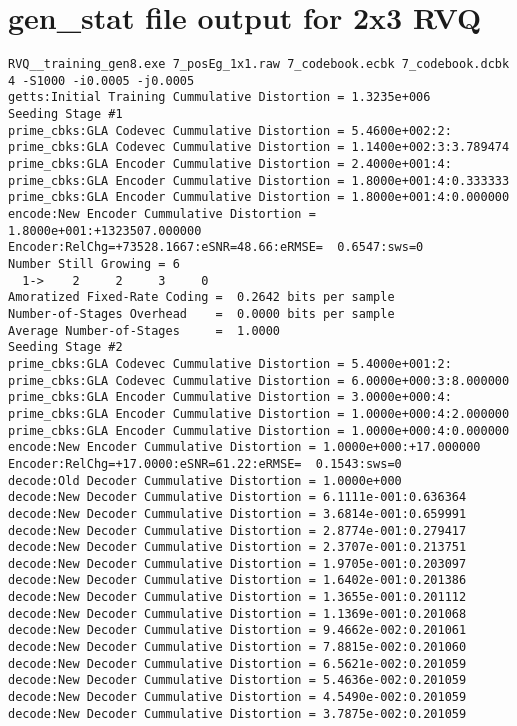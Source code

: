 \section{gen\_stat file output for 2x3 RVQ}
\label{gen_stat}
\scriptsize
\begin{verbatim}
RVQ__training_gen8.exe 7_posEg_1x1.raw 7_codebook.ecbk 7_codebook.dcbk 4 -S1000 -i0.0005 -j0.0005 
getts:Initial Training Cummulative Distortion = 1.3235e+006
Seeding Stage #1
prime_cbks:GLA Codevec Cummulative Distortion = 5.4600e+002:2:
prime_cbks:GLA Codevec Cummulative Distortion = 1.1400e+002:3:3.789474
prime_cbks:GLA Encoder Cummulative Distortion = 2.4000e+001:4:
prime_cbks:GLA Encoder Cummulative Distortion = 1.8000e+001:4:0.333333
prime_cbks:GLA Encoder Cummulative Distortion = 1.8000e+001:4:0.000000
encode:New Encoder Cummulative Distortion = 1.8000e+001:+1323507.000000
Encoder:RelChg=+73528.1667:eSNR=48.66:eRMSE=  0.6547:sws=0
Number Still Growing = 6
  1->    2     2     3     0 
Amoratized Fixed-Rate Coding =  0.2642 bits per sample
Number-of-Stages Overhead    =  0.0000 bits per sample
Average Number-of-Stages     =  1.0000
Seeding Stage #2
prime_cbks:GLA Codevec Cummulative Distortion = 5.4000e+001:2:
prime_cbks:GLA Codevec Cummulative Distortion = 6.0000e+000:3:8.000000
prime_cbks:GLA Encoder Cummulative Distortion = 3.0000e+000:4:
prime_cbks:GLA Encoder Cummulative Distortion = 1.0000e+000:4:2.000000
prime_cbks:GLA Encoder Cummulative Distortion = 1.0000e+000:4:0.000000
encode:New Encoder Cummulative Distortion = 1.0000e+000:+17.000000
Encoder:RelChg=+17.0000:eSNR=61.22:eRMSE=  0.1543:sws=0
decode:Old Decoder Cummulative Distortion = 1.0000e+000
decode:New Decoder Cummulative Distortion = 6.1111e-001:0.636364
decode:New Decoder Cummulative Distortion = 3.6814e-001:0.659991
decode:New Decoder Cummulative Distortion = 2.8774e-001:0.279417
decode:New Decoder Cummulative Distortion = 2.3707e-001:0.213751
decode:New Decoder Cummulative Distortion = 1.9705e-001:0.203097
decode:New Decoder Cummulative Distortion = 1.6402e-001:0.201386
decode:New Decoder Cummulative Distortion = 1.3655e-001:0.201112
decode:New Decoder Cummulative Distortion = 1.1369e-001:0.201068
decode:New Decoder Cummulative Distortion = 9.4662e-002:0.201061
decode:New Decoder Cummulative Distortion = 7.8815e-002:0.201060
decode:New Decoder Cummulative Distortion = 6.5621e-002:0.201059
decode:New Decoder Cummulative Distortion = 5.4636e-002:0.201059
decode:New Decoder Cummulative Distortion = 4.5490e-002:0.201059
decode:New Decoder Cummulative Distortion = 3.7875e-002:0.201059

\end{verbatim}
